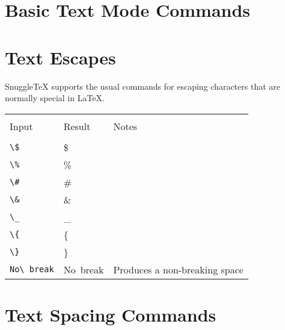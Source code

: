 
\section*{Basic Text Mode Commands}

\newenvironment{demotable}
{\begin{center}
 \begin{tabular}{|l|l|}
 \hline \\
 Input & Result \\
 \hline \\
}{\hline
 \end{tabular}
 \end{center}
}

\newenvironment{ndemotable}
{\begin{center}
 \begin{tabular}{|l|l|l|}
 \hline \\
 Input & Result & Notes \\
 \hline \\
}{\hline
 \end{tabular}
 \end{center}
}

\newcommand{\note}[1]{\small #1}
\newcommand{\demo}[1]{\verb|#1| & #1 \\}
\newcommand{\ndemo}[2]{\verb|#1| & #1 & \note{#2} \\}
\newcommand{\bigdemo}[1]{\begin{verbatim}#1\end{verbatim} & #1 \\}

\section*{Text Escapes}

SnuggleTeX supports the usual commands for escaping characters that are normally
special in LaTeX.

\begin{ndemotable}
\demo{\$}
\demo{\%}
\demo{\#}
\demo{\&}
\demo{\_}
\demo{\{}
\demo{\}}
\ndemo{No\ break}{Produces a non-breaking space}
\end{ndemotable}

\section*{Text Spacing Commands}

